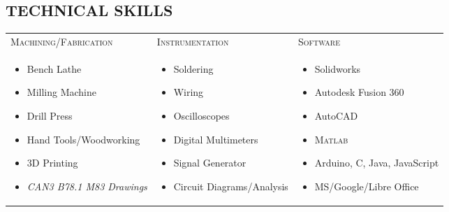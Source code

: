 \documentclass{article}
\begin{document}
\begin{textbox}
    \subsection*{ TECHNICAL SKILLS}
    \hline
    \vspace{1em}
    \centering
    \begin{tabu} to \textwidth {XXX}
    
       \textsc{\normalsize {} Machining/Fabrication} & \textsc{\normalsize {} Instrumentation} & \textsc{\normalsize {} Software} \\
       \vspace{-1.5em}
       \begin{itemize}
       \setlength\itemsep{-0.25em}
           \item Bench Lathe
           \item Milling Machine
           \item Drill Press
           \item Hand Tools/Woodworking
           \item 3D Printing
           \item \textit{CAN3 B78.1 M83 Drawings}
       \end{itemize} & 
       \vspace{-1.5em}
       \begin{itemize}
       \setlength\itemsep{-0.25em}
           \item Soldering
           \item Wiring
           \item Oscilloscopes
           \item Digital Multimeters
           \item Signal Generator
           \item Circuit Diagrams/Analysis
       \end{itemize} & 
       \vspace{-1.5em}
       \begin{itemize}
       \setlength\itemsep{-0.25em}
           \item Solidworks
           \item Autodesk Fusion 360
           \item AutoCAD
           \item \textsc{Matlab}
           \item Arduino, C, Java, JavaScript
           \item MS/Google/Libre Office
       \end{itemize}
       \bottomrule
    \end{tabu}
    

\end{textbox}
\end{document}
